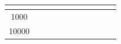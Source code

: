 \documentclass[a4paper,12pt]{article}
\begin{document}
\begin{table}[htbp]
\begin{tabular}{@{}|c|ccccc|ccccc|@{}}
        \multicolumn{1}{c|}{} &
        \multicolumn{1}{c|}{} &
        \multicolumn{1}{c|}{} &
        \\ \midrule
        1000 &
        \multicolumn{1}{c|}{} &
        \multicolumn{1}{c|}{} &
        \multicolumn{1}{c|}{} &
        \multicolumn{1}{c|}{} &
        &
        \multicolumn{1}{c|}{} &
        \multicolumn{1}{c|}{} &
        \multicolumn{1}{c|}{} &
        \multicolumn{1}{c|}{} &
        \\ \midrule
        10000 &
        \multicolumn{1}{c|}{} &
        \multicolumn{1}{c|}{} &
        \multicolumn{1}{c|}{} &
        \multicolumn{1}{c|}{} &
        &
        \multicolumn{1}{c|}{} &
        \multicolumn{1}{c|}{} &
        \multicolumn{1}{c|}{} &
        \multicolumn{1}{c|}{} &
        \\ \bottomrule
        \end{tabular}
    \end{table}
\end{document}
